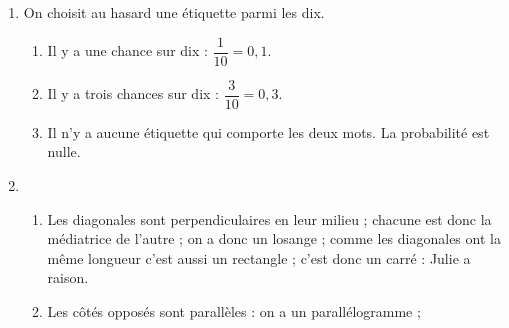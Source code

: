 \begin{enumerate}
\item On choisit au hasard une étiquette parmi les dix. 
	\begin{enumerate}
		\item %
Il y a une chance sur dix : $\dfrac{1}{10} = 0,1$.
		\item %
Il y a trois chances sur dix : $\dfrac{3}{10} = 0,3$.
		\item %
Il n'y a aucune étiquette qui comporte les deux mots. La probabilité est nulle.		
	\end{enumerate}
\item %
	\begin{enumerate}
		\item %
		

Les diagonales sont perpendiculaires en leur milieu ; chacune est donc la médiatrice de l'autre ; on a donc un losange ; comme les diagonales ont la même longueur c'est aussi un rectangle ; c'est donc un carré : Julie a raison. 
		\item %
		 
%
Les côtés opposés sont parallèles : on a un parallélogramme ;


\end{enumerate}
\end{enumerate}
